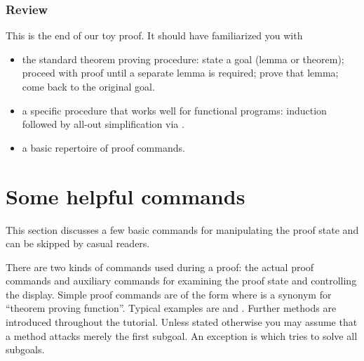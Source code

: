 \subsubsection*{Review}

This is the end of our toy proof. It should have familiarized you with
\begin{itemize}
\item the standard theorem proving procedure:
state a goal (lemma or theorem); proceed with proof until a separate lemma is
required; prove that lemma; come back to the original goal.
\item a specific procedure that works well for functional programs:
induction followed by all-out simplification via .
\item a basic repertoire of proof commands.
\end{itemize}


\section{Some helpful commands}
\label{sec:commands-and-hints}

This section discusses a few basic commands for manipulating the proof state
and can be skipped by casual readers.

There are two kinds of commands used during a proof: the actual proof
commands and auxiliary commands for examining the proof state and controlling
the display. Simple proof commands are of the form
 where  is a
synonym for ``theorem proving function''. Typical examples are
 and . Further methods are introduced throughout
the tutorial.  Unless stated otherwise you may assume that a method attacks
merely the first subgoal. An exception is  which tries to solve all
subgoals.

